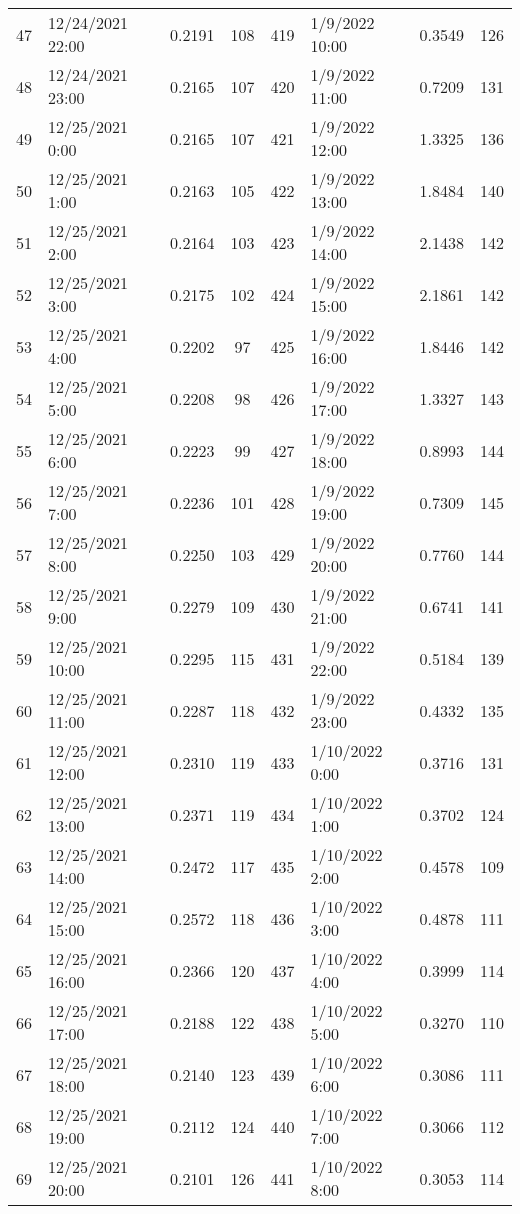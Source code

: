 \begin{center}
\begin{longtable}{llccllcc}
    47&12/24/2021  22:00&0.2191&108&419&1/9/2022 10:00	    &0.3549&126 \\
    48&12/24/2021  23:00&0.2165&107&420&1/9/2022 11:00	    &0.7209&131 \\
    49&12/25/2021  0:00	   &0.2165&107&421&1/9/2022 12:00	    &1.3325&136 \\
    50&12/25/2021  1:00	   &0.2163&105&422&1/9/2022 13:00	    &1.8484&140 \\
    51&12/25/2021  2:00	   &0.2164&103&423&1/9/2022 14:00	    &2.1438&142 \\
    52&12/25/2021  3:00	   &0.2175&102&424&1/9/2022 15:00	    &2.1861&142 \\
    53&12/25/2021  4:00	   &0.2202&97 &425&1/9/2022 16:00	    &1.8446&142 \\
    54&12/25/2021  5:00	   &0.2208&98 &426&1/9/2022 17:00	    &1.3327&143 \\
    55&12/25/2021  6:00	   &0.2223&99 &427&1/9/2022 18:00	    &0.8993&144 \\
    56&12/25/2021  7:00	   &0.2236&101&428&1/9/2022 19:00	    &0.7309&145 \\
    57&12/25/2021  8:00	   &0.2250&103&429&1/9/2022 20:00	    &0.7760&144 \\
    58&12/25/2021  9:00	   &0.2279&109&430&1/9/2022 21:00	    &0.6741&141 \\
    59&12/25/2021  10:00&0.2295&115&431&1/9/2022 22:00	    &0.5184&139 \\
    60&12/25/2021  11:00&0.2287&118&432&1/9/2022 23:00	    &0.4332&135 \\
    61&12/25/2021  12:00&0.2310&119&433&1/10/2022 0:00	    &0.3716&131 \\
    62&12/25/2021  13:00&0.2371&119&434&1/10/2022 1:00	    &0.3702&124 \\
    63&12/25/2021  14:00&0.2472&117&435&1/10/2022 2:00	    &0.4578&109 \\
    64&12/25/2021  15:00&0.2572&118&436&1/10/2022 3:00	    &0.4878&111 \\
    65&12/25/2021  16:00&0.2366&120&437&1/10/2022 4:00	    &0.3999&114 \\
    66&12/25/2021  17:00&0.2188&122&438&1/10/2022 5:00	    &0.3270&110 \\
    67&12/25/2021  18:00&0.2140&123&439&1/10/2022 6:00	    &0.3086&111 \\
    68&12/25/2021  19:00&0.2112&124&440&1/10/2022 7:00	    &0.3066&112 \\
    69&12/25/2021  20:00&0.2101&126&441&1/10/2022 8:00	    &0.3053&114 \\

\end{longtable}
\end{center}
